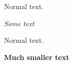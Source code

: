 \documentclass{article}
\begin{document}
	Normal text.
	
	\begin{center}
		{\itshape\large Some text\par}
		Normal text.
		{\bfseries\small Much smaller text\par}
	\end{center}
\end{document}
